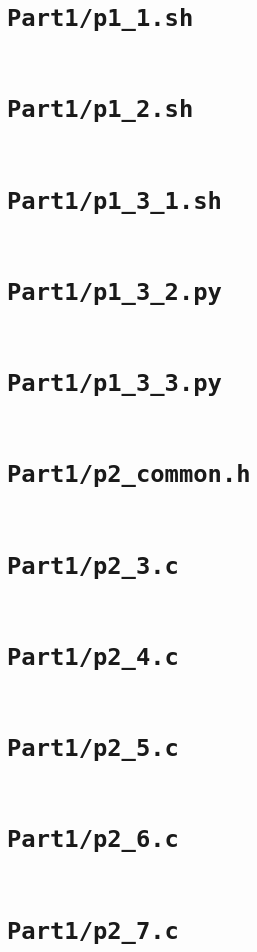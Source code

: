 \newpage
\onecolumn

\appendices

\section{\texttt{Part1/p1\_1.sh}}
\label{code:1_1}
\inputminted{bash}{../Part1/p1_1.sh}

\section{\texttt{Part1/p1\_2.sh}}
\label{code:1_2}
\inputminted{bash}{../Part1/p1_2.sh}

\section{\texttt{Part1/p1\_3\_1.sh}}
\label{code:1_3_1}
\inputminted{bash}{../Part1/p1_3_1.sh}

\section{\texttt{Part1/p1\_3\_2.py}}
\label{code:1_3_2}
\inputminted{python}{../Part1/p1_3_2.py}

\section{\texttt{Part1/p1\_3\_3.py}}
\label{code:1_3_3}
\inputminted{python}{../Part1/p1_3_3.py}

\section{\texttt{Part1/p2\_common.h}}
\label{code:2_common}
\inputminted{c}{../Part1/p2_common.h}

\section{\texttt{Part1/p2\_3.c}}
\label{code:2_3}
\inputminted{c}{../Part1/p2_3.c}

\section{\texttt{Part1/p2\_4.c}}
\label{code:2_4}
\inputminted{c}{../Part1/p2_4.c}

\section{\texttt{Part1/p2\_5.c}}
\label{code:2_5}
\inputminted{c}{../Part1/p2_5.c}

\section{\texttt{Part1/p2\_6.c}}
\label{code:2_6}
\inputminted{c}{../Part1/p2_6.c}

\section{\texttt{Part1/p2\_7.c}}
\label{code:2_7}
\inputminted{c}{../Part1/p2_7.c}

